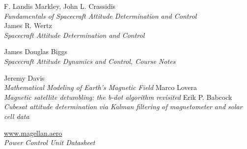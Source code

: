 \documentclass[11pt,a4paper]{report}
\begin{document}



\tableofcontents{}

\clearpage{}

\setcounter{page}{3}

\glsaddall
\glsdisablehyper
\printnoidxglossary[type=\acronymtype,title=Abbreviated Terms]

\nocite{*}
\renewcommand\bibname{Reference Books}
\begin{thebibliography}{0}
    F. Landis Markley, John L. Crassidis \\
    \textit{Fundamentals of Spacecraft Attitude Determination and Control} \\ 
    James R. Wertz \\
    \textit{Spacecraft Attitude Determination and Control}      \\
\end{thebibliography}

\renewcommand\bibname{Reference Notes}
\begin{thebibliography}{0}
\setcounter{enumiv}{2}
    James Douglas Biggs \\
    \textit{Spacecraft Attitude Dynamics and Control, Course Notes}  
\end{thebibliography}

\renewcommand\bibname{Reference Articles}
\begin{thebibliography}{0}
\setcounter{enumiv}{3}
    Jeremy Davis\\
    \textit{Mathematical Modeling of Earth’s Magnetic Field}
    Marco Lovera\\    
    \textit{Magnetic satellite detumbling: the b-dot algorithm revisited}
    Erik P. Babcock\\    
    \textit{Cubesat attitude determination via Kalman filtering of magnetometer and solar cell data}
\end{thebibliography}

\renewcommand\bibname{Datasheets \& User Manuals}
\renewcommand\UrlFont{\rmfamily}
\begin{thebibliography}{0}
\setcounter{enumiv}{6}
    \url{www.magellan.aero}\\
    \textit{Power Control Unit Datasheet} 
\end{thebibliography}
\end{document}
